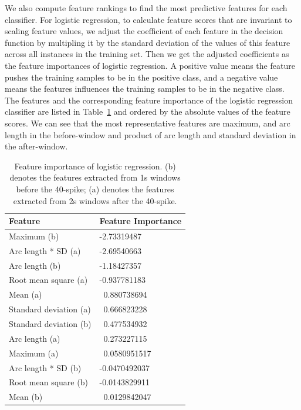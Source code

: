 \documentclass{soups}
\begin{document}
We also compute feature rankings to find the most predictive features for each classifier. 
For logistic regression, to calculate feature scores that are invariant to scaling feature values, we adjust the coefficient of each feature in the decision function by multipling it by the standard deviation of the values of this feature across all instances in the training set. 
Then we get the adjusted coefficients as the feature importances of logistic regression.
A positive value means the feature pushes the training samples to be in the positive class, and a negative value means the features influences the training samples to be in the negative class.
The features and the corresponding feature importance of the logistic regression classifier are listed in Table~\ref{tbl:importance-lr} and ordered by the absolute values of the feature scores. 
We can see that the most representative features are maximum, and arc length in the before-window and product of arc length and standard deviation in the after-window.

\begin{table}[H]
\centering
\begin{tabular}{@{}ll@{}}
\toprule
Feature                & Feature Importance \\ \midrule
Maximum (b)            & -2.73319487        \\
Arc length * SD (a)    & -2.69540663        \\
Arc length (b)         & -1.18427357        \\
Root mean square (a)   & -0.937781183       \\
Mean (a)               & \ 0.880738694      \\
Standard deviation (a) & \ 0.666823228      \\
Standard deviation (b) & \ 0.477534932      \\
Arc length (a)         & \ 0.273227115      \\
Maximum (a)            & \ 0.0580951517     \\
Arc length * SD (b)    & -0.0470492037      \\
Root mean square (b)   & -0.0143829911      \\
Mean (b)               & \ 0.0129842047     \\ \bottomrule
\end{tabular}
\caption{Feature importance of logistic regression. (b) denotes the features extracted from 1s windows before the 40-spike; (a) denotes the features extracted from 2s windows after the 40-spike.}
\label{tbl:importance-lr}
\end{table}
\end{document}
